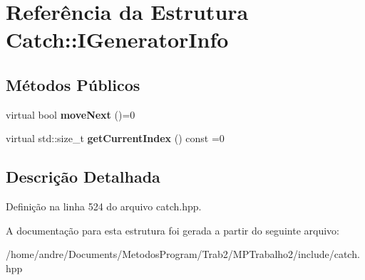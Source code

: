 \hypertarget{structCatch_1_1IGeneratorInfo}{}\section{Referência da Estrutura Catch\+:\+:I\+Generator\+Info}
\label{structCatch_1_1IGeneratorInfo}
\subsection*{Métodos Públicos}
\begin{DoxyCompactItemize}
\item 
virtual bool {\bfseries move\+Next} ()=0\hypertarget{structCatch_1_1IGeneratorInfo_a2b86711ca7009903edfe27ed62b515ef}{}\label{structCatch_1_1IGeneratorInfo_a2b86711ca7009903edfe27ed62b515ef}

\item 
virtual std\+::size\+\_\+t {\bfseries get\+Current\+Index} () const =0\hypertarget{structCatch_1_1IGeneratorInfo_a6a0dca712d31f6849fd9447b1344673a}{}\label{structCatch_1_1IGeneratorInfo_a6a0dca712d31f6849fd9447b1344673a}

\end{DoxyCompactItemize}


\subsection{Descrição Detalhada}


Definição na linha 524 do arquivo catch.\+hpp.



A documentação para esta estrutura foi gerada a partir do seguinte arquivo\+:\begin{DoxyCompactItemize}
\item 
/home/andre/\+Documents/\+Metodos\+Program/\+Trab2/\+M\+P\+Trabalho2/include/catch.\+hpp\end{DoxyCompactItemize}
